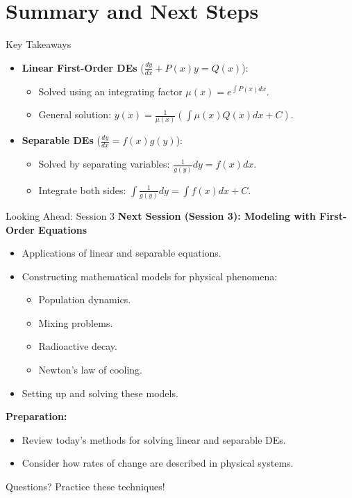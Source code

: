 \documentclass[10pt,aspectratio=169]{beamer}
\begin{document}
\section{Summary and Next Steps}

\begin{frame}{Key Takeaways}
    \begin{itemize}
        \item \textbf{Linear First-Order DEs} ($\frac{dy}{dx} + P(x)y = Q(x)$):
        \begin{itemize}
            \item Solved using an integrating factor $\mu(x) = e^{\int P(x)dx}$.
            \item General solution: $y(x) = \frac{1}{\mu(x)} \left( \int \mu(x)Q(x)dx + C \right)$.
        \end{itemize}
        \item \textbf{Separable DEs} ($\frac{dy}{dx} = f(x)g(y)$):
        \begin{itemize}
            \item Solved by separating variables: $\frac{1}{g(y)}dy = f(x)dx$.
            \item Integrate both sides: $\int \frac{1}{g(y)}dy = \int f(x)dx + C$.
        \end{itemize}
    \end{itemize}
\end{frame}

\begin{frame}{Looking Ahead: Session 3}
    \textbf{Next Session (Session 3): Modeling with First-Order Equations}
    \begin{itemize}
        \item Applications of linear and separable equations.
        \item Constructing mathematical models for physical phenomena:
        \begin{itemize}
            \item Population dynamics.
            \item Mixing problems.
            \item Radioactive decay.
            \item Newton's law of cooling.
        \end{itemize}
        \item Setting up and solving these models.
    \end{itemize}
    \vspace{1em}
    \textbf{Preparation:}
    \begin{itemize}
        \item Review today's methods for solving linear and separable DEs.
        \item Consider how rates of change are described in physical systems.
    \end{itemize}
\end{frame}

\begin{frame}[standout]
    Questions?
    \vspace{1cm}
    Practice these techniques!
\end{frame}
\end{document}
